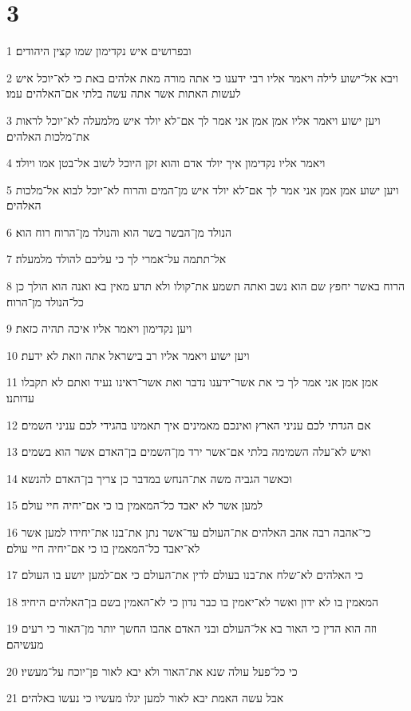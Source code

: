 \chapter{3}

\par 1 ובפרושים איש נקדימון שמו קצין היהודים׃
\par 2 ויבא אל־ישוע לילה ויאמר אליו רבי ידענו כי אתה מורה מאת אלהים באת כי לא־יוכל איש לעשות האתות אשר אתה עשה בלתי אם־האלהים עמו׃
\par 3 ויען ישוע ויאמר אליו אמן אמן אני אמר לך אם־לא יולד איש מלמעלה לא־יוכל לראות את־מלכות האלהים׃
\par 4 ויאמר אליו נקדימון איך יולד אדם והוא זקן היוכל לשוב אל־בטן אמו ויולד׃
\par 5 ויען ישוע אמן אמן אני אמר לך אם־לא יולד איש מן־המים והרוח לא־יוכל לבוא אל־מלכות האלהים׃
\par 6 הנולד מן־הבשר בשר הוא והנולד מן־הרוח רוח הוא׃
\par 7 אל־תתמה על־אמרי לך כי עליכם להולד מלמעלה׃
\par 8 הרוח באשר יחפץ שם הוא נשב ואתה תשמע את־קולו ולא תדע מאין בא ואנה הוא הולך כן כל־הנולד מן־הרוח׃
\par 9 ויען נקדימון ויאמר אליו איכה תהיה כזאת׃
\par 10 ויען ישוע ויאמר אליו רב בישראל אתה וזאת לא ידעת׃
\par 11 אמן אמן אני אמר לך כי את אשר־ידענו נדבר ואת אשר־ראינו נעיד ואתם לא תקבלו עדותנו׃
\par 12 אם הגדתי לכם עניני הארץ ואינכם מאמינים איך תאמינו בהגידי לכם עניני השמים׃
\par 13 ואיש לא־עלה השמימה בלתי אם־אשר ירד מן־השמים בן־האדם אשר הוא בשמים׃
\par 14 וכאשר הגביה משה את־הנחש במדבר כן צריך בן־האדם להנשא׃
\par 15 למען אשר לא יאבד כל־המאמין בו כי אם־יחיה חיי עולם׃
\par 16 כי־אהבה רבה אהב האלהים את־העולם עד־אשר נתן את־בנו את־יחידו למען אשר לא־יאבד כל־המאמין בו כי אם־יחיה חיי עולם׃
\par 17 כי האלהים לא־שלח את־בנו בעולם לדין את־העולם כי אם־למען יושע בו העולם׃
\par 18 המאמין בו לא ידון ואשר לא־יאמין בו כבר נדון כי לא־האמין בשם בן־האלהים היחיד׃
\par 19 וזה הוא הדין כי האור בא אל־העולם ובני האדם אהבו החשך יותר מן־האור כי רעים מעשיהם׃
\par 20 כי כל־פעל עולה שנא את־האור ולא יבא לאור פן־יוכח על־מעשיו׃
\par 21 אבל עשה האמת יבא לאור למען יגלו מעשיו כי נעשו באלהים׃
